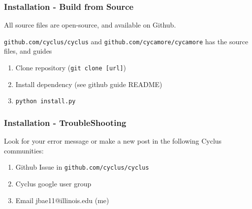 \begin{frame}
	\frametitle{Installation - Build from Source}
    All source files are open-source, and available on Github.

	\texttt{github.com/cyclus/cyclus} and \texttt{github.com/cycamore/cycamore} has the source files, and guides
	\begin{enumerate}
		\item Clone repository (\texttt{git clone [url]})
		\item Install dependency (see github guide README)
		\item \texttt{python install.py}
	\end{enumerate}
\end{frame}


\begin{frame}
	\frametitle{Installation - TroubleShooting}
	Look for your error message or make a new post in the following Cyclus communities:
	\begin{enumerate}
		\item Github Issue in \texttt{github.com/cyclus/cyclus}
		\item Cyclus google user group
        \item Email jbae11@illinois.edu (me)
	\end{enumerate}
\end{frame}

